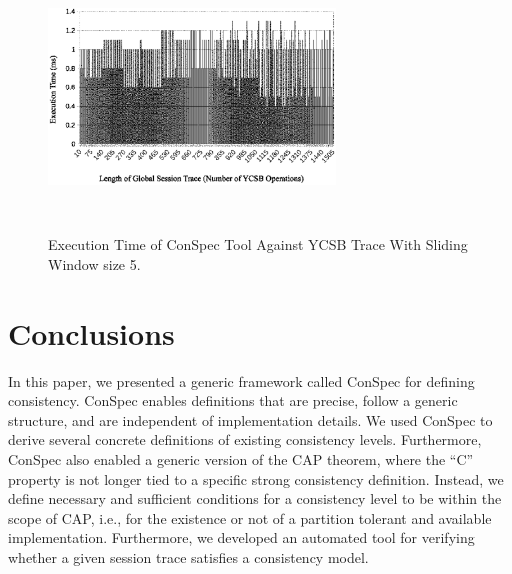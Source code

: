 \documentclass[journal,compsoc]{IEEEtran}
\begin{document}
\begin{figure}%
        \includegraphics[width=3in,height=2.8in]
                    {conspecExecutionTimes.eps} %
        \caption{Execution Time of ConSpec Tool Against YCSB Trace With Sliding Window size 5.}
        \label{fig:exampleIter}
\end{figure}

\section{Conclusions} \label{sec:conc}
In this paper, we presented a generic framework called ConSpec for defining consistency. ConSpec enables definitions that are precise, follow a generic structure, and are independent of implementation details. We used ConSpec to derive several concrete definitions of existing consistency levels. Furthermore, ConSpec also enabled a generic version of the CAP theorem, where the ``C'' property is not longer tied to a specific strong consistency definition. Instead, we define necessary and sufficient conditions for a consistency level to be within the scope of CAP, i.e., for the existence or not of a partition tolerant and available implementation.
Furthermore, we developed an automated tool for verifying whether a given session trace satisfies a consistency model. 
\end{document}
